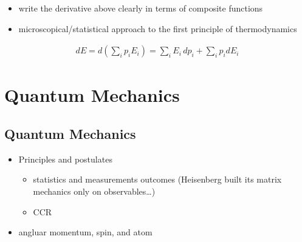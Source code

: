 \documentclass[letterpaper,10pt,english]{jupyterBook}
\begin{document}
\sphinxAtStartPar
{}
\begin{itemize}
\item {} 
\sphinxAtStartPar
write the derivative above clearly in terms of composite functions

\item {} 
\sphinxAtStartPar
microscopical/statistical approach to the first principle of thermodynamics

\end{itemize}
\begin{equation*}
\begin{split}d E = d \left( \sum_i p_i E_i \right) = \sum_i E_i \, d p_i + \sum_i p_i d E_i\end{split}
\end{equation*}
\sphinxstepscope


\part{Quantum Mechanics}

\sphinxstepscope


\chapter{Quantum Mechanics}
\label{\detokenize{ch/quantum-mechanics/intro:quantum-mechanics}}\label{\detokenize{ch/quantum-mechanics/intro:quantum-mechanics-intro}}\label{\detokenize{ch/quantum-mechanics/intro::doc}}\begin{itemize}
\item {} 
\sphinxAtStartPar
Principles and postulates
\begin{itemize}
\item {} 
\sphinxAtStartPar
statistics and measurements outcomes (Heisenberg built its matrix mechanics only on observables…)

\item {} 
\sphinxAtStartPar
CCR

\end{itemize}

\item {} 
\sphinxAtStartPar
angluar momentum, spin, and atom

\end{itemize}
\end{document}
